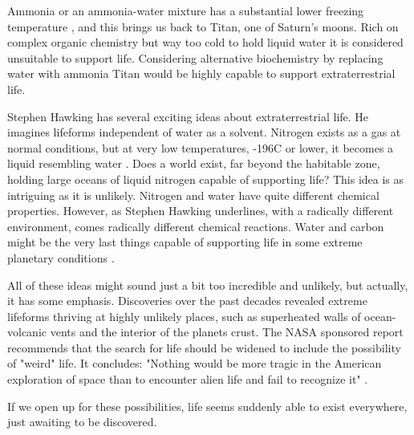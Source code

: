 Ammonia or an ammonia-water mixture has a substantial lower freezing temperature \cite{OForm3}, and this brings us back to Titan, one of Saturn's moons.
Rich on complex organic chemistry but way too cold to hold liquid water it is considered unsuitable to support life.
Considering alternative biochemistry by replacing water with ammonia Titan would be highly capable to support extraterrestrial life.

Stephen Hawking has several exciting ideas about extraterrestrial life.
He imagines lifeforms independent of water as a solvent.
Nitrogen exists as a gas at normal conditions, but at very low temperatures, -196\degree C or lower, it becomes a liquid resembling water \cite{OForm6}.
Does a world exist, far beyond the habitable zone, holding large oceans of liquid nitrogen capable of supporting life?
This idea is as intriguing as it is unlikely.
Nitrogen and water have quite different chemical properties.
However, as Stephen Hawking underlines, with a radically different environment, comes radically different chemical reactions.
Water and carbon might be the very last things capable of supporting life in some extreme planetary conditions \cite{OForm3}.

All of these ideas might sound just a bit too incredible and unlikely, but actually, it has some emphasis. 
Discoveries over the past decades revealed extreme lifeforms thriving at highly unlikely places, such as superheated walls of ocean-volcanic vents and the interior of the planets crust.
The NASA sponsored report recommends that the search for life should be widened to include the possibility of "weird" life.
It concludes: "Nothing would be more tragic in the American exploration of space than to encounter alien life and fail to recognize it" \cite{OForm3}.

If we open up for these possibilities, life seems suddenly able to exist everywhere, just awaiting to be discovered.